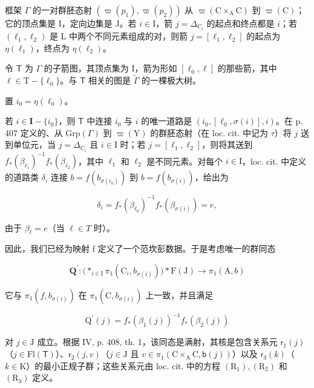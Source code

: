 框架 \(\Gamma\) 的一对群胚态射 \((\varpi(p_1), \varpi(p_2))\) 从 \(\varpi(\mathrm{C} \times_{\mathrm{A}} \mathrm{C})\) 到 \(\varpi(\mathrm{C})\)；它的顶点集是 I，定向边集是 J。若 \(i \in \mathrm{I}\)，箭 \(j = \Delta_{\mathrm{C}_i}\) 的起点和终点都是 \(i\)；若 \((\ell_1, \ell_2)\) 是 L 中两个不同元素组成的对，则箭 \(j = [\ell_1, \ell_2]\) 的起点为 \(\eta(\ell_1)\)，终点为 \(\eta(\ell_2)\)。

令 \(\mathsf{T}\) 为 \(\Gamma\) 的子箭图，其顶点集为 I，箭为形如 \([\ell_0,\ell ]\) 的那些箭，其中 \(\ell \in \mathrm{T} - \{\ell_0\}\)。与 \(\mathsf{T}\) 相关的图是 \(\widetilde{\Gamma}\) 的一棵极大树。

置 \(i_0 = \eta (\ell_0)\)。

若 \(i \in \mathbf{I} - \{i_0\}\)，则 \(\mathsf{T}\) 中连接 \(i_0\) 与 \(i\) 的唯一道路是 \((i_0, [\ell_0, \sigma(i)], i)\)。在 p. 407 定义的、从 \(\mathrm{Grp}(\Gamma)\) 到 \(\varpi(\mathrm{Y})\) 的群胚态射（在 loc. cit. 中记为 \(\tau\)）将 \(j\) 送到单位元，当 \(j = \Delta_{\mathrm{C}_i}\) 且 \(i \in \mathrm{I}\) 时；若 \(j = [\ell_1, \ell_2]\)，则将其送到 \(f_*(\beta_{\ell_1})^{-1}f_*(\beta_{\ell_2})\)，其中 \(\ell_1\) 和 \(\ell_2\) 是不同元素。对每个 \(i \in \mathrm{I}\)，loc. cit. 中定义的道路类 \(\delta_i\) 连接 \(b = f(b_{\sigma(i_0)})\) 到 \(b = f(b_{\sigma(i)})\)，给出为

\[
\delta_ {i} = f _ {*} (\beta_ {\ell_ {0}}) ^ {- 1} f _ {*} (\beta_ {\sigma (i)}) = e,
\]

由于 \(\beta_{\ell} = e\)（当 \(\ell \in T\) 时）。

因此，我们已经为映射 f 定义了一个范坎彭数据。于是考虑唯一的群同态

\[
\mathbf {Q} ^ {\prime} \colon \big (\ast_ {i \in \mathrm{I}} \pi_ {1} (\mathrm{C} _ {i}, b _ {\sigma (i)}) \big) * \mathrm{F} (\mathrm{J}) \to \pi_ {1} (\mathrm{A}, b)
\]

它与 \(\pi_1(f, b_{\sigma(i)})\) 在 \(\pi_1(\mathrm{C}, b_{\sigma(i)})\) 上一致，并且满足

\[
\mathrm{Q} ^ {\prime} (j) = f _ {*} (\beta_ {1} (j)) ^ {- 1} f _ {*} (\beta_ {2} (j))
\]

对 \(j \in \mathrm{J}\) 成立。根据 IV, p. 408, th. 1，该同态是满射，其核是包含关系元 \(\mathsf{r}_1(j)\)（\(j \in \mathrm{Fl}(\mathsf{T})\)）、\(\mathsf{r}_2(j,v)\)（\(j \in \mathrm{J}\) 且 \(v \in \pi_1(\mathrm{C} \times_{\mathrm{A}} \mathrm{C}, \mathsf{b}(j))\)）以及 \(\mathsf{r}_3(k)\)（\(k \in \mathrm{K}\)）的最小正规子群；这些关系元由 loc. cit. 中的方程 \((\mathrm{R}_1), (\mathrm{R}_2)\) 和 \((\mathrm{R}_3)\) 定义。

